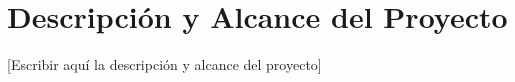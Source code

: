 
\section{Descripción y Alcance del Proyecto}
\label{s:descripcion-alcance}

[Escribir aquí la descripción y alcance del proyecto]
